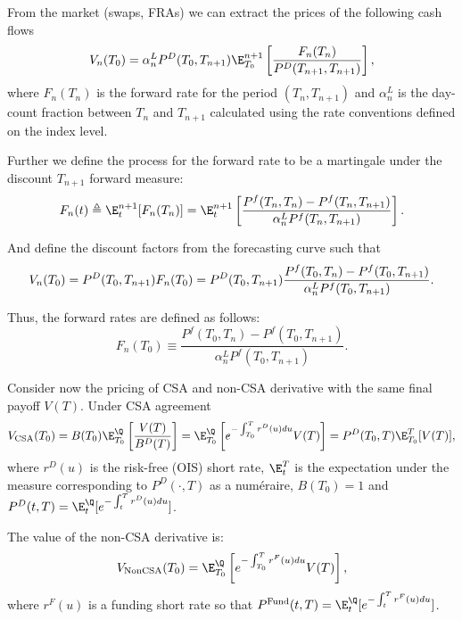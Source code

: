 \documentclass[]{pmv_report} %
\begin{document}
From the market (swaps, FRAs) we can extract the prices of the following cash flows
\begin{equation}
V_n(T_0)=\alpha_n^L P^D(T_0,T_{n+1}) \E_{T_0}^{n+1} \left[ \frac{F_n(T_n)}{P^D(T_{n+1},T_{n+1})} \right],
\end{equation}
where $F_n(T_n)$ is the forward rate for the period $(T_n,T_{n+1})$ and $\alpha_n^L$ is the day-count fraction between $T_n$ and $T_{n+1}$ calculated using the rate conventions defined on the index level.

Further we define the process for the forward rate to be a martingale under the discount $T_{n+1}$ forward measure:
\begin{equation}
\label{libor}
F_n(t)\triangleq\E_t^{n+1} [F_n(T_n)]=\E_t^{n+1} \left[ \frac{P^f(T_n,T_{n})-P^f(T_n,T_{n+1})} {\alpha_n^L P^f(T_{n},T_{n+1})} \right].
\end{equation}

And define the discount factors from the forecasting curve such that
\begin{equation}
V_n(T_0)= P^D(T_0,T_{n+1})F_n(T_0) = P^D(T_0,T_{n+1}) \frac{P^f(T_0,T_n)-P^f(T_0,T_{n+1})}{\alpha_n^L P^f(T_{0},T_{n+1})\\ } .
 \end{equation}

Thus, the forward rates are defined as follows:
\begin{equation}
\label{eq:unadjfwd}
F_n(T_0) \equiv \frac{P^f(T_0,T_n) - P^f(T_0,T_{n+1})}{\alpha_n^L P^f(T_0,T_{n+1}) }.
\end{equation}

Consider now the pricing of CSA and non-CSA derivative with the same final payoff $V(T)$.
Under CSA agreement
\begin{equation*}
V_{\text{CSA}}(T_0)=B(T_0) \E_{T_0}^{\Q} \left[\frac{V(T)}{B^D(T)}\right]=\E_{T_0}^{\Q} \left[ e^{-\int_{T_0}^T r^D(u)du} V(T)\right] = P^D(T_0,T) \E_{T_0}^T[V(T)],
\end{equation*}
where $r^D(u)$ is the risk-free (OIS) short rate, $\E_t^T$ is the expectation under the measure corresponding to $P^D(\cdot,T)$ as a num\'eraire, $B(T_0)=1$ and $P^D(t,T)=\E_{t}^{\Q}[e^{-\int_{t}^T r^D(u)du}]$.

The value of the non-CSA derivative is:
\begin{equation}\label{eq:ncsa}
V_{\text{NonCSA}}(T_0)=\E_{T_0}^{\Q} \left[ e^{-\int_{T_0}^T r^F(u)du} V(T)\right],
\end{equation}
where $r^F(u)$ is a funding short rate so that $P^{\text{Fund}}(t,T)=\E_t^{\Q}[e^{-\int_{t}^T r^F(u)du}]$.
\end{document}
